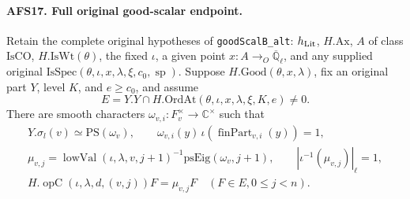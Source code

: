\documentclass[11pt,a4paper]{article}
\numberwithin{equation}{section}
\theoremstyle{remark}\newtheorem{remark}[theorem]{Remark}
\begin{document}
\paragraph{AFS17. Full original good-scalar endpoint.}
\label{claim:AFS17}
Retain the complete original hypotheses of
\texttt{good\allowbreak Scal\allowbreak B\_\allowbreak alt}: $h_{\rm Lit}$, $H.\mathrm{Ax}$,
$A$ of class $\mathrm{IsCO}$, $H.\mathrm{IsWt}(\theta)$,
the fixed $\iota$, a given point $x:A\to_O
\overline{\mathbb Q}_\ell$, and any supplied original
$\mathrm{IsSpec}(\theta,\iota,x,\lambda,\xi,c_0,\operatorname{sp})$.
Suppose $H.\mathrm{Good}(\theta,x,\lambda)$, fix an original
part $Y$, level $K$, and $e\geq c_0$, and assume
\[
 E=Y.Y\cap H.\mathrm{OrdAt}(\theta,\iota,x,\lambda,\xi,K,e)
                                                        \ne0.
\]
There are smooth characters $\omega_{v,i}:F_v^\times\to
\mathbb C^\times$ such that
\begin{gather*}
 Y.\sigma_l(v)\simeq\mathrm{PS}(\omega_v),\qquad
 \omega_{v,i}(y)\,
       \iota(\operatorname{finPart}_{v,i}(y))=1,\\
 \mu_{v,j}=\operatorname{lowVal}(\iota,\lambda,v,j+1)^{-1}
                         \mathrm{psEig}(\omega_v,j+1),\qquad
 |\iota^{-1}(\mu_{v,j})|_\ell=1,\\
 H.\operatorname{opC}(\iota,\lambda,d,(v,j))F
                   =\mu_{v,j}F\quad(F\in E, 0\leq j<n).
\end{gather*}
\end{document}
